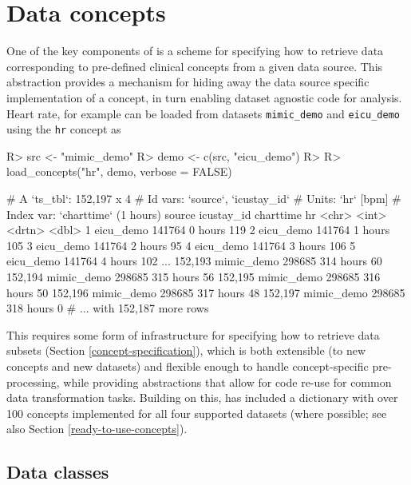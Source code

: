 \documentclass[
  notitle]{jss}
\begin{document}
\hypertarget{data-concepts}{%
\section{Data concepts}\label{data-concepts}}

One of the key components of  is a scheme for specifying how
to retrieve data corresponding to pre-defined clinical concepts from a
given data source. This abstraction provides a mechanism for hiding away
the data source specific implementation of a concept, in turn enabling
dataset agnostic code for analysis. Heart rate, for example can be
loaded from datasets \texttt{mimic\_demo} and \texttt{eicu\_demo} using
the \texttt{hr} concept as

\begin{CodeChunk}
\begin{CodeInput}
R> src  <- "mimic_demo"
R> demo <- c(src, "eicu_demo")
R> 
R> load_concepts("hr", demo, verbose = FALSE)
\end{CodeInput}
\begin{CodeOutput}
# A `ts_tbl`: 152,197 x 4
# Id vars:    `source`, `icustay_id`
# Units:      `hr` [bpm]
# Index var:  `charttime` (1 hours)
        source     icustay_id charttime    hr
        <chr>           <int> <drtn>    <dbl>
      1 eicu_demo      141764   0 hours   119
      2 eicu_demo      141764   1 hours   105
      3 eicu_demo      141764   2 hours    95
      4 eicu_demo      141764   3 hours   106
      5 eicu_demo      141764   4 hours   102
    ...
152,193 mimic_demo     298685 314 hours    60
152,194 mimic_demo     298685 315 hours    56
152,195 mimic_demo     298685 316 hours    50
152,196 mimic_demo     298685 317 hours    48
152,197 mimic_demo     298685 318 hours     0
# ... with 152,187 more rows
\end{CodeOutput}
\end{CodeChunk}

This requires some form of infrastructure for specifying how to retrieve
data subsets (Section \ref{concept-specification}), which is both
extensible (to new concepts and new datasets) and flexible enough to
handle concept-specific pre-processing, while providing abstractions
that allow for code re-use for common data transformation tasks.
Building on this,  has included a dictionary with over 100
concepts implemented for all four supported datasets (where possible;
see also Section \ref{ready-to-use-concepts}).

\hypertarget{data-classes}{%
\subsection{Data classes}\label{data-classes}}
\end{document}
